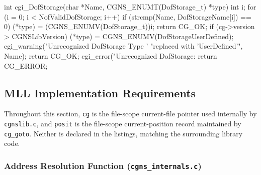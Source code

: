 \documentclass[11pt,letterpaper]{article}
\makeatletter
\let\cgns@orig@lstlisting\lstlisting
\let\cgns@endorig@lstlisting\endlstlisting
\renewenvironment{lstlisting}
  {\par\needspace{5\baselineskip}\nolinenumbers\cgns@orig@lstlisting}
  {\cgns@endorig@lstlisting\par\linenumbers}
\makeatother
\begin{document}
\begin{lstlisting}[language=C]
int cgi_DofStorage(char *Name, CGNS_ENUMT(DofStorage_t) *type)
{
    int i;
    for (i = 0; i < NofValidDofStorage; i++) {
        if (strcmp(Name, DofStorageName[i]) == 0) {
            (*type) = (CGNS_ENUMV(DofStorage_t))i;
            return CG_OK;
        }
    }
    if (cg->version > CGNSLibVersion) {
        (*type) = CGNS_ENUMV(DofStorageUserDefined);
        cgi_warning("Unrecognized DofStorage Type '%s' "
                    "replaced with 'UserDefined'", Name);
        return CG_OK;
    }
    cgi_error("Unrecognized DofStorage: %s", Name);
    return CG_ERROR;
}
\end{lstlisting}

\subsection{MLL Implementation Requirements}
\label{sec:mll-impl}

Throughout this section, \texttt{cg} is the file-scope
current-file pointer used internally by \texttt{cgnslib.c}, and
\texttt{posit} is the file-scope current-position record maintained by
\texttt{cg\_goto}.  Neither is declared in the listings, matching the
surrounding library code.

\subsubsection{Address Resolution Function (\texttt{cgns\_internals.c})}
\label{sec:address}
\end{document}
